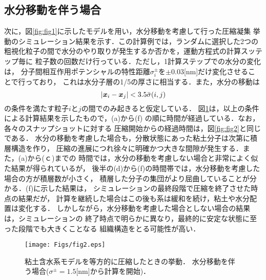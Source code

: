 ﻿\documentclass[11pt,a4j]{jarticle}
\begin{document}
\subsection{水分移動を伴う場合}
次に，図\ref{fig:fig1}に示したモデルを用い，水分移動を考慮して行った圧縮凝集
挙動のシミュレーション結果を示す．この計算例では，ランダムに選択した2つの
粗視化粒子の間で水分のやり取りが発生するか否かを，運動方程式の計算スッテップ毎に
粒子数の回数だけ行っている．ただし，1計算ステップでの水分の変化は，
分子間相互作用ポテンシャルの特性距離$\sigma_i^\pm$を$\pm 0.03$[nm]だけ変化させることで行っており，
これは水分子層の1/5の厚さに相当する．また，水分の移動は
\begin{equation}
	\left| \mbox{\boldmath $x$}_i -\mbox{\boldmath $x$}_j\right| < 3.5 \bar{\sigma}(i,j)
	\label{eqn:rij_max}
\end{equation}
の条件を満たす粒子$i$と$j$の間でのみ起きると仮定している．
図\ref{fig:fig3}は，以上の条件による計算結果を示したもので，(a)から(f)
の順に時間が経過している．なお，各々のスナップショットに対する
圧縮開始からの経過時間は，図\ref{fig:fig2}と同じである．
水分の移動を考慮した場合も，分散状態にあった粘土分子は次第に積層構造を作り，
圧縮の進展につれ徐々に明確かつ大きな間隙が発生する．また，(a)から(ｃ)までの
時間では，水分の移動を考慮しない場合と非常によく似た結果が得られているが，
後半の(d)から(f)の時間帯では，水分移動を考慮した場合の方が積層数が小さく，
積層した分子の集団がより屈曲していることが分かる．(f)に示した結果は，
シミュレーションの最終段階で圧縮を終了させた時点の結果だが，
計算を継続した場合はこの後も系は緩和を続け，粘土や水分配置は変化する．
しかしながら，水分移動を考慮した場合としない場合の結果は，シミュレーションの
終了時点で明らかに異なり，最終的に安定な状態に至った段階でも大きくことなる
組織構造をとる可能性が高い．
\begin{figure}[h]
	\begin{center}
	\texttt{[image: Figs/fig2.eps]} 
	\end{center}
	\caption{
		粘土含水系モデルを等方的に圧縮したときの挙動．
		水分移動を伴う場合($\sigma^\pm=1.5$[nm]から計算を開始)．
	} 
	\label{fig:fig3}
\end{figure}
\end{document}
